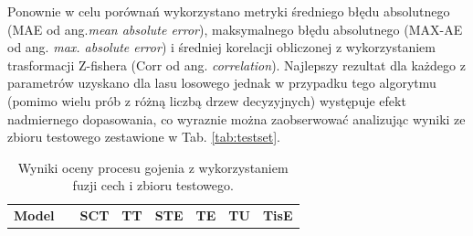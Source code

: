 Ponownie w celu porównań wykorzystano metryki średniego błędu absolutnego (MAE od ang.\textit{mean absolute error}), maksymalnego błędu absolutnego (MAX-AE od ang. \textit{max. absolute error}) i średniej korelacji obliczonej z wykorzystaniem trasformacji Z-fishera (Corr od ang. \textit{correlation}). Najlepszy rezultat dla każdego z parametrów uzyskano dla lasu losowego jednak w przypadku tego algorytmu (pomimo wielu prób z różną liczbą drzew decyzyjnych) występuje efekt nadmiernego dopasowania, co wyraznie można zaobserwować analizując wyniki ze zbioru testowego zestawione w Tab. \ref{tab:testset}. 

\begin{table}[h]
	\caption{Wyniki oceny procesu gojenia z wykorzystaniem fuzji cech i zbioru testowego.}
	\scriptsize
	\begin{center}
		\begin{tabular}{lc||c|c|c|c|c|c}
			\textbf{Model} & & \textbf{SCT} & \textbf{TT} & \textbf{STE} & \textbf{TE} & \textbf{TU} & \textbf{TisE}\\ 
			

\end{tabular}
\end{center}
\end{table}

